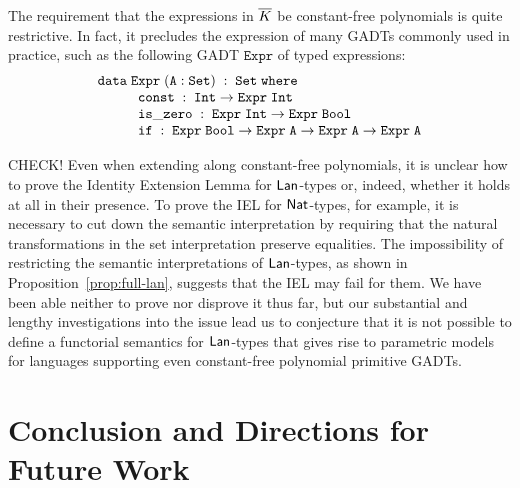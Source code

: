 \documentclass{lmcs}
\theoremstyle{plain}\newtheorem{satz}[thm]{Satz}
\begin{document}
The requirement that the {\color{red} expressions} in $\overline{K}$ be
constant-free polynomials is quite restrictive. In fact, it precludes
the expression of many GADTs commonly used in practice, such as the
following GADT $\mathtt{Expr}$ of typed expressions:
\[
\begin{array}{l}
\mathtt{data\; Expr \;(A : Set)\;:\;Set\;where}\\
\hspace*{0.4in}\mathtt{const\;:\; Int \to Expr\; Int}\\
\hspace*{0.4in}\mathtt{is\_zero\;:\; Expr\; Int \rightarrow Expr\; Bool}\\
\hspace*{0.4in}\mathtt{if\;:\; Expr\; Bool \to Expr\; A \to Expr\; A \to Expr\; A}
\end{array}
\]

{\color{red} CHECK!} Even when extending along constant-free
polynomials, it is unclear how to prove the Identity Extension Lemma
for $\mathsf{Lan}$-types or, indeed, whether it holds at all in their
presence. To prove the IEL for $\mathsf{Nat}$-types, for example, it is
necessary to cut down the semantic interpretation by requiring that
the natural transformations in the set interpretation preserve
equalities. The impossibility of restricting the semantic
interpretations of $\mathsf{Lan}$-types, as shown in
Proposition~\ref{prop:full-lan}, suggests that the IEL may fail for
them. We have been able neither to prove nor disprove it thus far, but
our substantial and lengthy investigations into the issue lead us to
conjecture that it is not possible to define a functorial semantics
for $\mathsf{Lan}$-types that gives rise to parametric models for languages
supporting even constant-free polynomial primitive GADTs.

\section{Conclusion and Directions for Future Work}\label{sec:conclusion}
\end{document}
